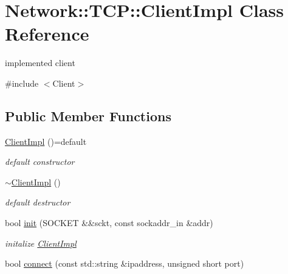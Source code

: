\hypertarget{class_network_1_1_t_c_p_1_1_client_impl}{}\section{Network\+:\+:T\+CP\+:\+:Client\+Impl Class Reference}
\label{class_network_1_1_t_c_p_1_1_client_impl}


implemented client  




{\ttfamily \#include $<$Client$>$}

\subsection*{Public Member Functions}
\begin{DoxyCompactItemize}
\item 
\mbox{\label{class_network_1_1_t_c_p_1_1_client_impl_a5bcb4cebfa4575171d89079185041346}} 
\hyperlink{class_network_1_1_t_c_p_1_1_client_impl_a5bcb4cebfa4575171d89079185041346}{Client\+Impl} ()=default
\begin{DoxyCompactList}\small\item\em default constructor \end{DoxyCompactList}\item 
\mbox{\label{class_network_1_1_t_c_p_1_1_client_impl_a56e23c20825cb58dc3d3dbbefb24a019}} 
\hyperlink{class_network_1_1_t_c_p_1_1_client_impl_a56e23c20825cb58dc3d3dbbefb24a019}{$\sim$\+Client\+Impl} ()
\begin{DoxyCompactList}\small\item\em default destructor \end{DoxyCompactList}\item 
bool \hyperlink{class_network_1_1_t_c_p_1_1_client_impl_ac2284b2ba25fc0aec5a62813c68a267b}{init} (S\+O\+C\+K\+ET \&\&sckt, const sockaddr\+\_\+in \&addr)
\begin{DoxyCompactList}\small\item\em initalize \hyperlink{class_network_1_1_t_c_p_1_1_client_impl}{Client\+Impl} \end{DoxyCompactList}\item 
bool \hyperlink{class_network_1_1_t_c_p_1_1_client_impl_a9d5de8ece0a7cc8ebdb497a15ee7c340}{connect} (const std\+::string \&ipaddress, unsigned short port)

\end{DoxyCompactItemize}
